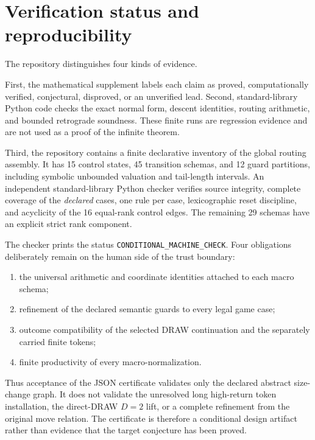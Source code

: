 \documentclass[11pt]{article}
\begin{document}
\section{Verification status and reproducibility}

The repository distinguishes four kinds of evidence.

First, the mathematical supplement labels each claim as proved,
computationally verified, conjectural, disproved, or an unverified lead.
Second, standard-library Python code checks the exact normal form, descent
identities, routing arithmetic, and bounded retrograde soundness. These finite
runs are regression evidence and are not used as a proof of the infinite
theorem.

Third, the repository contains a finite declarative inventory of the global
routing assembly. It has 15 control states, 45 transition schemas, and 12
guard partitions, including symbolic unbounded valuation and tail-length
intervals. An independent standard-library Python checker verifies source
integrity, complete coverage of the \emph{declared} cases, one rule per case,
lexicographic reset discipline, and acyclicity of the 16 equal-rank control
edges. The remaining 29 schemas have an explicit strict rank component.

The checker prints the status \texttt{CONDITIONAL\_MACHINE\_CHECK}. Four
obligations deliberately remain on the human side of the trust boundary:
\begin{enumerate}
  \item the universal arithmetic and coordinate identities attached to each
        macro schema;
  \item refinement of the declared semantic guards to every legal game case;
  \item outcome compatibility of the selected DRAW continuation and the
        separately carried finite tokens;
  \item finite productivity of every macro-normalization.
\end{enumerate}
Thus acceptance of the JSON certificate validates only the declared abstract
size-change graph.  It does not validate the unresolved long high-return token
installation, the direct-DRAW $D=2$ lift, or a complete refinement from the
original move relation.  The certificate is therefore a conditional design
artifact rather than evidence that the target conjecture has been proved.
\end{document}
